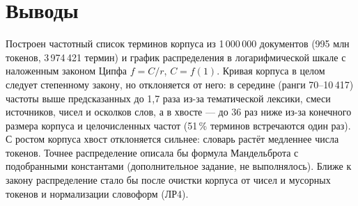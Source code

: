 \section{Выводы}
Построен частотный список терминов корпуса из 1\,000\,000 документов (995 млн токенов, 3\,974\,421 термин) и график распределения в логарифмической шкале с наложенным законом Ципфа $f = C/r$, $C = f(1)$. Кривая корпуса в целом следует степенному закону, но отклоняется от него: в середине (ранги 70--10\,417) частоты выше предсказанных до 1,7 раза из-за тематической лексики, смеси источников, чисел и осколков слов, а в хвосте --- до 36 раз ниже из-за конечного размера корпуса и целочисленных частот (51\,\% терминов встречаются один раз). С ростом корпуса хвост отклоняется сильнее: словарь растёт медленнее числа токенов. Точнее распределение описала бы формула Мандельброта с подобранными константами (дополнительное задание, не выполнялось). Ближе к закону распределение стало бы после очистки корпуса от чисел и мусорных токенов и нормализации словоформ (ЛР4).
